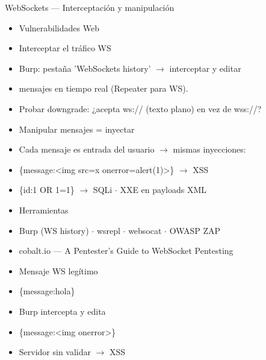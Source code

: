 \documentclass[aspectratio=169,10pt]{beamer}
\begin{document}
\begin{frame}[allowframebreaks]{WebSockets --- Interceptación y manipulación}
\small
  \begin{itemize}
  \item Vulnerabilidades Web
  \item Interceptar el tráfico WS
  \item Burp: pestaña 'WebSockets history' $\rightarrow$ interceptar y editar
  \item mensajes en tiempo real (Repeater para WS).
  \item Probar downgrade: ¿acepta ws:// (texto plano) en vez de wss://?
  \item Manipular mensajes = inyectar
  \item Cada mensaje es entrada del usuario $\rightarrow$ mismas inyecciones:
  \item \{\textquotedbl{}message\textquotedbl{}:\textquotedbl{}\textless{}img src=x onerror=alert(1)\textgreater{}\textquotedbl{}\} $\rightarrow$ XSS
  \item \{\textquotedbl{}id\textquotedbl{}:\textquotedbl{}1 OR 1=1\textquotedbl{}\} $\rightarrow$ SQLi $\cdot$ XXE en payloads XML
  \item Herramientas
  \item Burp (WS history) $\cdot$ wsrepl $\cdot$ websocat $\cdot$ OWASP ZAP
  \item cobalt.io --- A Pentester's Guide to WebSocket Pentesting
  \item Mensaje WS legítimo
  \item \{\textquotedbl{}message\textquotedbl{}:\textquotedbl{}hola\textquotedbl{}\}
  \item Burp intercepta y edita
  \item \{\textquotedbl{}message\textquotedbl{}:\textquotedbl{}\textless{}img onerror\textgreater{}\textquotedbl{}\}
  \item Servidor sin validar $\rightarrow$ XSS
  \end{itemize}
\end{frame}
\end{document}
